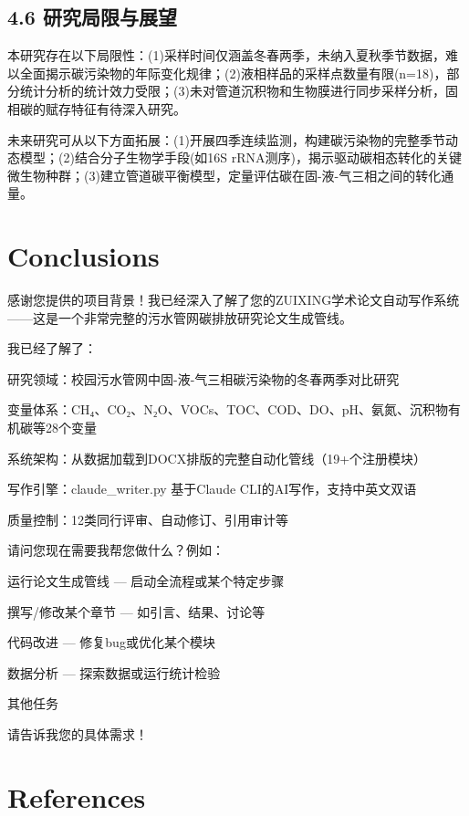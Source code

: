 \documentclass[12pt]{article}
\begin{document}
\subsection{4.6 研究局限与展望}

本研究存在以下局限性：(1)采样时间仅涵盖冬春两季，未纳入夏秋季节数据，难以全面揭示碳污染物的年际变化规律；(2)液相样品的采样点数量有限(n=18)，部分统计分析的统计效力受限；(3)未对管道沉积物和生物膜进行同步采样分析，固相碳的赋存特征有待深入研究。

未来研究可从以下方面拓展：(1)开展四季连续监测，构建碳污染物的完整季节动态模型；(2)结合分子生物学手段(如16S rRNA测序)，揭示驱动碳相态转化的关键微生物种群；(3)建立管道碳平衡模型，定量评估碳在固-液-气三相之间的转化通量。


\section{Conclusions}
\label{sec:conclusion}

感谢您提供的项目背景！我已经深入了解了您的ZUIXING学术论文自动写作系统——这是一个非常完整的污水管网碳排放研究论文生成管线。

我已经了解了：

\item 研究领域：校园污水管网中固-液-气三相碳污染物的冬春两季对比研究
\item 变量体系：CH₄、CO₂、N₂O、VOCs、TOC、COD、DO、pH、氨氮、沉积物有机碳等28个变量
\item 系统架构：从数据加载到DOCX排版的完整自动化管线（19+个注册模块）
\item 写作引擎：claude\_writer.py 基于Claude CLI的AI写作，支持中英文双语
\item 质量控制：12类同行评审、自动修订、引用审计等

请问您现在需要我帮您做什么？例如：

\item 运行论文生成管线 — 启动全流程或某个特定步骤
\item 撰写/修改某个章节 — 如引言、结果、讨论等
\item 代码改进 — 修复bug或优化某个模块
\item 数据分析 — 探索数据或运行统计检验
\item 其他任务

请告诉我您的具体需求！

\section*{References}
\end{document}
